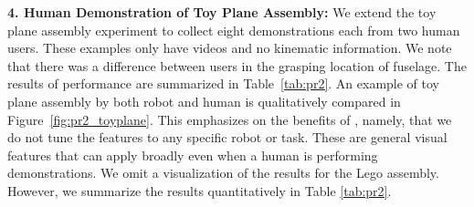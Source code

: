 \vspace{5pt}
\noindent \textbf{4. Human Demonstration of Toy Plane Assembly: }
We extend the toy plane assembly experiment to collect eight demonstrations each from two human users. These examples only have videos and no kinematic information. We note that there was a difference between users in the grasping location of fuselage. 
The results of \tsc performance are summarized in Table~\ref{tab:pr2}.
An example of toy plane assembly by both robot and human is qualitatively compared in Figure~\ref{fig:pr2_toyplane}. 
This emphasizes on the benefits of \tsc, namely, that we do not tune the features to any specific robot or task. 
These are general visual features that can apply broadly even when a human is performing demonstrations.
We omit a visualization of the results for the Lego assembly. However, we summarize the results quantitatively in Table \ref{tab:pr2}.



